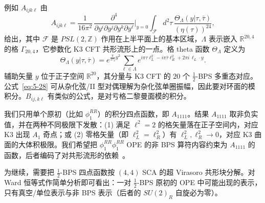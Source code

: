 
例如 $A_{ijk\ell}$ 由
\begin{equation}
  \label{eq:5-28}
  A_{ijk\ell}
  = \frac{1}{16\pi^2}\,
    \frac{\partial^4}{\partial y^i\partial y^j\partial y^k\partial y^\ell}
    \bigg|_{y=0}
    \int_{\mathcal{F}} d^2\tau\,
    \frac{\Theta_\Lambda(y|\tau,\bar\tau)}{(\eta(\tau))^{24}},
\end{equation}
给出，其中 $\mathcal{F}$ 是 $PSL(2,\mathbb{Z})$ 作用在上半平面上的基本区域，$\Lambda$ 表示嵌入 $\mathbb{R}^{20,4}$ 的格 $\Gamma_{20,4}$，它参数化 K3 CFT 共形流形上的一点。格 theta 函数 $\Theta_\Lambda$ 定义为
\begin{equation}
  \label{eq:5-29}
  \Theta_\Lambda(y|\tau,\bar\tau)
  = e^{\frac{\pi}{2\tau_2}y^2}
    \sum_{\ell\in\Lambda}
    e^{i\pi\tau\ell_L^2 - i\pi\bar\tau\ell_R^2
      + 2\pi i\,\ell_L\cdot y}.
\end{equation}
辅助矢量 $y$ 位于正子空间 $\mathbb{R}^{20}$，其分量与 K3 CFT 的 $20$ 个 $\frac12$-BPS 多重态对应。公式~\eqref{eq:5-28} 可从杂化弦/II 型对偶理解为杂化弦单圈振幅，因此要对环面的模积分。$B_{ij,k\ell}$ 有类似的公式，是对亏格二黎曼面模的积分。



我们只用单个原初（比如 $\phi_1^{RR}$）的积分四点函数，即 $A_{1111}$。结果 $A_{1111}$ 取非负实值，并在两种不同极限下发散：(1) 满足 $\ell^2=2$ 的格矢量落在正子空间内，对应 K3 出现 $A_1$ 奇点；或 (2) 零格矢量（即 $\ell_L^2=\ell_R^2$）有 $\ell_L^2,\ell_R^2\to0$，对应 K3 曲面的大体积极限。我们希望把 $\phi_1^{RR}\phi_1^{RR}$ OPE 的非 BPS 算符内容约束为 $A_{1111}$ 的函数，后者编码了对共形流形的依赖~\cite{r64}。

为继续，需要把 $\frac12$-BPS 四点函数按 $(4,4)$ SCA 的超 Virasoro 共形块分解。对 Ward 恒等式作简单分析即可看出：一对 $\frac12$-BPS 原初的 OPE 中可能出现的表示，只有真空/单位表示与非 BPS 表示（后者的 $SU(2)_R$ 自旋必为零）。

